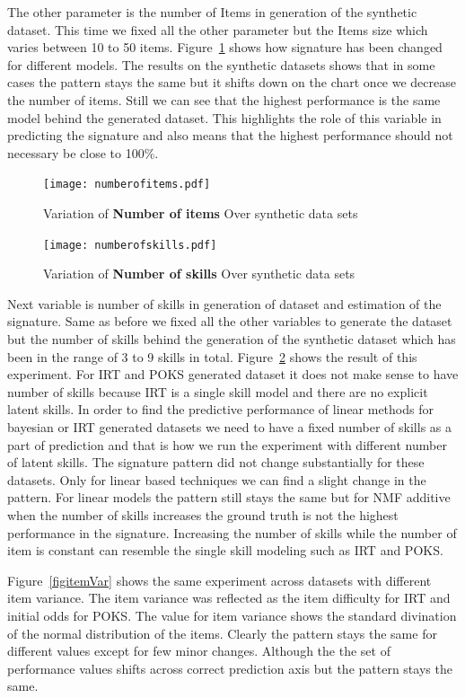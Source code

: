 The other parameter is the number of Items in generation of the synthetic dataset. This time we fixed all the other parameter but the Items size which varies between 10 to 50 items. Figure~\ref{figNumberofItems} shows how signature has been changed for different models. The results on the synthetic datasets shows that in some cases the pattern stays the same but it shifts down on the chart once we decrease the number of items. Still we can see that the highest performance is the same model behind the generated dataset. This highlights the role of this variable in predicting the signature and also means that the highest performance should not necessary be close to 100\%.

\begin{figure}
  \centering
    \texttt{[image: numberofitems.pdf]}
\caption{Variation of \textbf{Number of items} Over synthetic data sets}
\label{figNumberofItems}
\end{figure}

\begin{figure}
  \centering
    \texttt{[image: numberofskills.pdf]}
\caption{Variation of \textbf{Number of skills} Over synthetic data sets}
\label{figSkills}
\end{figure}

Next variable is number of skills in generation of dataset and estimation of the signature. Same as before we fixed all the other variables to generate the dataset but the number of skills behind the generation of the synthetic dataset which has been in the range of 3 to 9 skills in total. Figure~\ref{figSkills} shows the result of this experiment. For IRT and POKS generated dataset it does not make sense to have number of skills because IRT is a single skill model and there are no explicit latent skills. In order to find the predictive performance of linear methods for bayesian or IRT generated datasets we need to have a fixed number of skills as a part of prediction and that is how we run the experiment with different number of latent skills. The signature pattern did not change substantially for these datasets. Only for linear based techniques we can find a slight change in the pattern. For linear models the pattern still stays the same but for NMF additive when the number of skills increases the ground truth is not the highest performance in the signature. Increasing the number of skills while the number of item is constant can resemble the single skill modeling such as IRT and POKS. 

Figure~\ref{figitemVar} shows the same experiment across datasets with different item variance. The item variance was reflected as the item difficulty for IRT and initial odds for POKS. The value for item variance shows the standard divination of the normal distribution of the items. Clearly the pattern stays the same for different values except for few minor changes. Although the the set of performance values shifts across correct prediction axis but the pattern stays the same.

